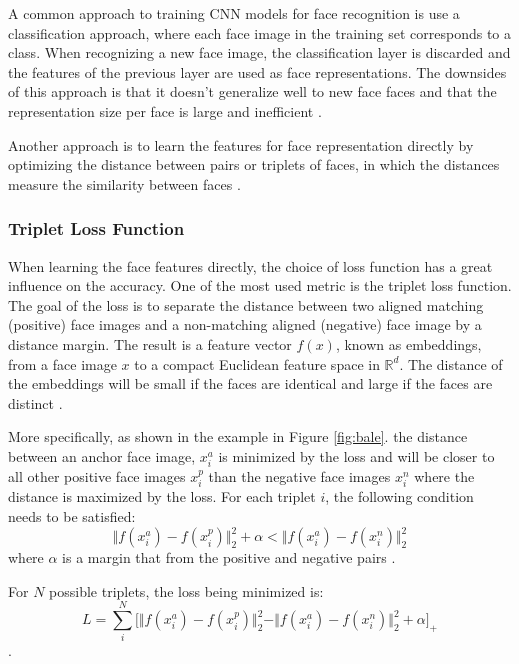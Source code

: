\documentclass[12pt,english]{article}
\begin{document}
A common approach to training CNN models for face recognition is use a classification approach, where each face image in the training set corresponds to a class. When recognizing a new face image, the classification layer is discarded and the features of the previous layer are used as face representations. The downsides of this approach is that it doesn't generalize well to new face faces and that the representation size per face is large and inefficient \cite{schroff}.

Another approach is to learn the features for face representation directly by optimizing the distance between pairs or triplets of faces, in which the distances measure the similarity between faces \cite{trigueros} \cite{schroff}. 

\subsubsection{Triplet Loss Function}

\quad
When learning the face features directly, the choice of loss function has a great influence on the accuracy. One of the most used metric is the triplet loss function. The goal of the loss is to separate the distance between two aligned matching (positive) face images and a non-matching aligned (negative) face image by a distance margin. The result is a feature vector $f(x)$, known as embeddings, from a face image $x$ to a compact Euclidean feature space in $ \mathbb{R}^{d}$. The distance of the embeddings will be small if the faces are identical and large if the faces are distinct \cite{schroff}.


More specifically, as shown in the example in Figure \ref{fig:bale}. the distance between an anchor face image, $x_{i}^{a}$ is minimized by the loss and will be closer to all other positive face images $x_{i}^{p}$ than the negative face images $x_{i}^{n}$ where the distance is maximized by the loss. For each triplet $i$, the following condition needs to be satisfied: $$\Vert f(x_{i}^{a}) - f(x_{i}^{p}) \Vert_{2}^{2} + \alpha < \Vert f(x_{i}^{a}) - f(x_{i}^{n}) \Vert_{2}^{2} $$
where $\alpha$ is a margin that from the positive and negative pairs \cite{trigueros}.

For $N$ possible triplets, the loss being minimized is: $$ L = \sum_{i}^{N} \Big[ \Vert f(x_{i}^{a}) - f(x_{i}^{p}) \Vert_{2}^{2} - \Vert f(x_{i}^{a}) - f(x_{i}^{n}) \Vert_{2}^{2} + \alpha\Big]_{+} $$ \cite{schroff}.
\end{document}
